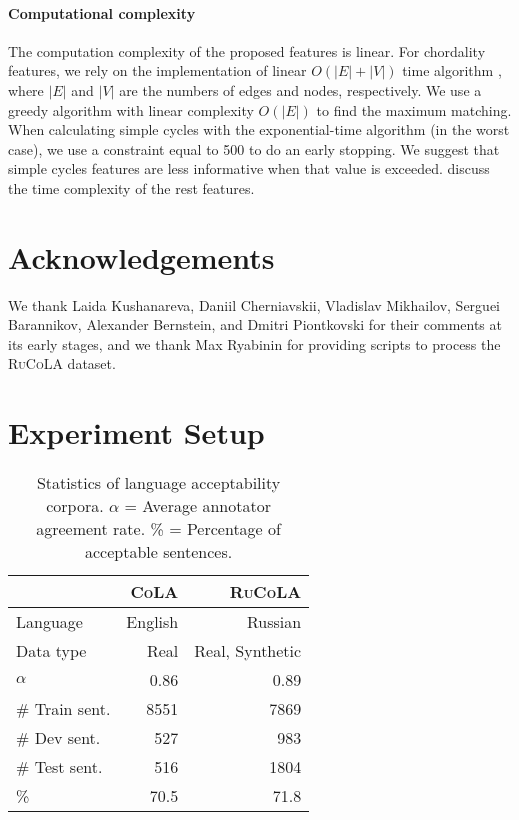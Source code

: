 \documentclass[11pt]{article}
\begin{document}
\paragraph{Computational complexity}
The computation complexity of the proposed features is linear. 
For chordality features, we rely on the implementation of linear $O(|E|+|V|)$ time algorithm \cite{tarjan1984simple}, where $|E|$ and $|V|$ are the numbers of edges and nodes, respectively.
We use a greedy algorithm with linear complexity $O(|E|)$ to find the maximum matching.
When calculating simple cycles with the exponential-time algorithm (in the worst case), we use a constraint equal to 500 to do an early stopping.
We suggest that simple cycles features are less informative when that value is exceeded.
\citealp{kushnareva-etal-2021-artificial} discuss the time complexity of the rest features.

\section*{Acknowledgements}
We thank Laida Kushanareva,  Daniil Cherniavskii, Vladislav Mikhailov, Serguei Barannikov, Alexander Bernstein, and Dmitri Piontkovski for their comments at its early stages, and we thank Max Ryabinin for providing scripts to process the \textsc{RuCoLA} dataset. 




\appendix

\newpage 
\clearpage

\onecolumn 

\section{Experiment Setup}
\label{sec:app_data}
\begin{table}[th!]
\small
\centering
\newcommand{\hsp}{\hspace{4pt}}
\begin{tabular}{lrr} 
\toprule
 &  \textbf{\textsc{CoLA}} & \textbf{\textsc{RuCoLA}}  \\
\midrule
Language & English & Russian \\
Data type & Real & Real, Synthetic\\
$\alpha$ & 0.86  & 0.89\\
\# Train sent. & 8551 & 7869 \\
\# Dev sent. & 527   & 983 \\
\# Test sent. &  516 & 1804 \\
\% & 70.5 & 71.8\\
\bottomrule
\end{tabular}
\caption{Statistics of language acceptability corpora. $\alpha$ = Average annotator agreement rate. \% = Percentage of acceptable sentences. }
\label{tab:corpora-summary}
\end{table}
\end{document}
